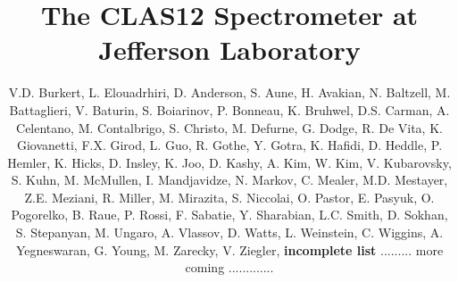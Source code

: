 \documentclass[final,3p,twocolumn]{elsarticle}
\begin{document}
\begin{frontmatter}

  \title{The CLAS12 Spectrometer at Jefferson Laboratory}
\author{V.D. Burkert, L. Elouadrhiri, D. Anderson, S. Aune, H. Avakian, N. Baltzell, M. Battaglieri,  V. Baturin,
  S. Boiarinov, P. Bonneau, K. Bruhwel, D.S. Carman, A. Celentano, M. Contalbrigo, S. Christo, M. Defurne, G. Dodge,
  R. De Vita, K. Giovanetti, F.X. Girod, L. Guo, R. Gothe, Y. Gotra, K. Hafidi, D. Heddle, P. Hemler, K. Hicks, D. Insley, K. Joo,
  D. Kashy, A. Kim, W. Kim, V. Kubarovsky, S. Kuhn, M. McMullen, I. Mandjavidze, N. Markov, C. Mealer, M.D. Mestayer,
  Z.E. Meziani, R. Miller, M. Mirazita, S. Niccolai, O. Pastor, E. Pasyuk, O. Pogorelko, B. Raue, P. Rossi, F. Sabatie,
  Y. Sharabian, L.C. Smith, D. Sokhan, S. Stepanyan, M. Ungaro, A. Vlassov, D. Watts, L. Weinstein, C. Wiggins,
  A. Yegneswaran, G. Young, M. Zarecky, V. Ziegler, {\bf incomplete list} ......... more coming ............. }

\end{frontmatter}
\end{document}
